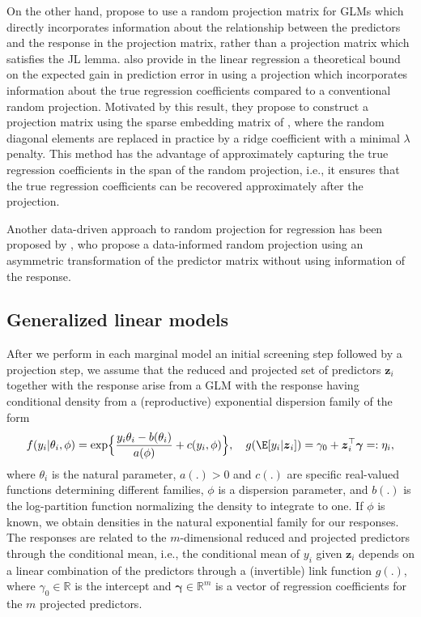 \documentclass[
  article,
  nojss]{jss}
\begin{document}
On the other hand, \citet{parzer2024glms} propose to use a random
projection matrix for GLMs which directly incorporates information about
the relationship between the predictors and the response in the
projection matrix, rather than a projection matrix which satisfies the
JL lemma. \citet{parzer2024sparse} also provide in the linear regression
a theoretical bound on the expected gain in prediction error in using a
projection which incorporates information about the true regression
coefficients compared to a conventional random projection. Motivated by
this result, they propose to construct a projection matrix using the
sparse embedding matrix of \citet{Clarkson2013LowRankApprox}, where the
random diagonal elements are replaced in practice by a ridge coefficient
with a minimal \(\lambda\) penalty. This method has the advantage of
approximately capturing the true regression coefficients in the span of
the random projection, i.e., it ensures that the true regression
coefficients can be recovered approximately after the projection.

Another data-driven approach to random projection for regression has
been proposed by \citet{ryder2019asymmetric}, who propose a
data-informed random projection using an asymmetric transformation of
the predictor matrix without using information of the response.

\subsection{Generalized linear models}\label{generalized-linear-models}

After we perform in each marginal model an initial screening step
followed by a projection step, we assume that the reduced and projected
set of predictors \(\boldsymbol{z}_i\) together with the response arise
from a GLM with the response having conditional density from a
(reproductive) exponential dispersion family of the form
\begin{align*}\label{eqn:y_density}
f(y_i|\theta_i,\phi) = \exp\Bigl\{\frac{y_i\theta_i- b(\theta_i)}{a(\phi)} + c(y_i,\phi)\Bigr\},
\quad
g(\E[y_i|\boldsymbol{z}_i]) = \gamma_0 + \boldsymbol{z}_i^\top\boldsymbol{\gamma}=:\eta_i,
\end{align*} where \(\theta_i\) is the natural parameter, \(a(.)>0\) and
\(c(.)\) are specific real-valued functions determining different
families, \(\phi\) is a dispersion parameter, and \(b(.)\) is the
log-partition function normalizing the density to integrate to one. If
\(\phi\) is known, we obtain densities in the natural exponential family
for our responses. The responses are related to the \(m\)-dimensional
reduced and projected predictors through the conditional mean, i.e., the
conditional mean of \(y_i\) given \({\boldsymbol{z}}_i\) depends on a
linear combination of the predictors through a (invertible) link
function \(g(.)\), where \(\gamma_0\in\mathbb{R}\) is the intercept and
\(\boldsymbol{\gamma}\in\mathbb{R}^m\) is a vector of regression
coefficients for the \(m\) projected predictors.
\end{document}
